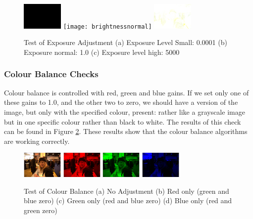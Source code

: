 \documentclass[10pt,a4paper]{article}
\begin{document}
\begin{figure}
    \centering
    \subfigure
    {
        \includegraphics[width=75px]{brightnesspoint0001}
    }
    \subfigure
    {
        \texttt{[image: brightnessnormal]}
    }
    \subfigure
    {
        \includegraphics[width=75px]{brightness5000}
    }
    \caption{
        Test of Exposure Adjustment 
        (a) Exposure Level Small: 0.0001
        (b) Exposure normal: 1.0
        (c) Exposure level high: 5000
    }
    \label{exposuretest}
 \end{figure}

\subsubsection{Colour Balance Checks}
Colour balance is controlled with red, green and blue gains. If we set only one of these gains to 1.0, and the other two to zero, we should
have a version of the image, but only with the specified colour, present: rather like a grayscale image but in one specific colour rather than black to white.
The results of this check can be found in Figure \ref{colourbalancetest}. These results show that the colour balance algorithms are working correctly.
\begin{figure}
    \centering
    \subfigure
    {
        \includegraphics[width=75px]{colourtest_no_adjustment}
    }
    \subfigure
    {
        \includegraphics[width=75px]{colourtest_redonly}
    }
    \subfigure
    {
        \includegraphics[width=75px]{colourtest_greenonly}
    }
    \subfigure
    {
        \includegraphics[width=75px]{blueonly}
    }
    \caption{
        Test of Colour Balance 
        (a) No Adjustment
        (b) Red only (green and blue zero)
        (c) Green only (red and blue zero)
        (d) Blue only (red and green zero)
    }
    \label{colourbalancetest}
 \end{figure}
\end{document}
